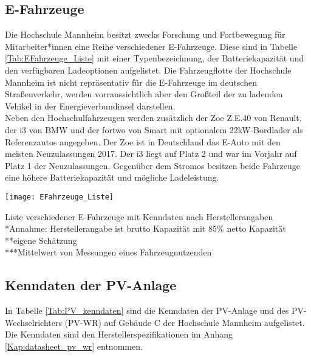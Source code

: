 	\subsection{E-Fahrzeuge}
		\label{Kap:Fahrzeuge}
		Die Hochschule Mannheim besitzt zwecks Forschung und Fortbewegung für Mitarbeiter*innen eine Reihe verschiedener E-Fahrzeuge. Diese sind in Tabelle \ref{Tab:EFahrzeuge_Liste} mit einer Typenbezeichnung, der Batteriekapazität und den verfügbaren Ladeoptionen aufgelistet. Die Fahrzeugflotte der Hochschule Mannheim ist nicht repräsentativ für die E-Fahrzeuge im deutschen Straßenverkehr, werden vorraussichtlich aber den Großteil der zu ladenden Vehikel in der Energieverbundinsel darstellen.  \\
		
		Neben den Hochschulfahrzeugen werden zusätzlich der Zoe Z.E.40 von Renault, der i3 von BMW und der fortwo von Smart mit optionalem 22kW-Bordlader als Referenzautos angegeben. Der Zoe ist in Deutschland das E-Auto mit den meisten Neuzulassungen 2017. Der i3 liegt auf Platz 2 und war  im Vorjahr auf Platz 1 der Neuzulassungen. Gegenüber dem Stromos besitzen beide Fahrzeuge eine höhere Batteriekapazität und mögliche Ladeleistung. \cite{EAutos_Ranking}
		
		\begin{table}[h]
			\centering
			\texttt{[image: EFahrzeuge\_Liste]}
			\caption{Liste verschiedener E-Fahrzeuge mit Kenndaten nach Herstellerangaben\cite{spec_i3} \cite{spec_i3eng} \cite{spec_zoe} \cite{spec_stromos} \cite{spec_smart} \cite{spec_prius} \cite{spec_zero} \\ *Annahme: Herstellerangabe ist brutto Kapazität mit 85\% netto Kapazität
			\\ **eigene Schätzung
			\\ ***Mittelwert von Messungen eines Fahrzeugnutzenden \cite{spec_zoeeta}}
			\label{Tab:EFahrzeuge_Liste}
		\end{table}			
		
    \subsection{Kenndaten der PV-Anlage}
		In Tabelle \ref{Tab:PV_kenndaten} sind die Kenndaten der PV-Anlage und des PV-Wechselrichters (PV-WR) auf Gebäude C der Hochschule Mannheim aufgelistet. Die Kenndaten sind den Herstellerspezifikationen im Anhang \ref{Kap:datasheet_pv_wr} entnommen. 
		
